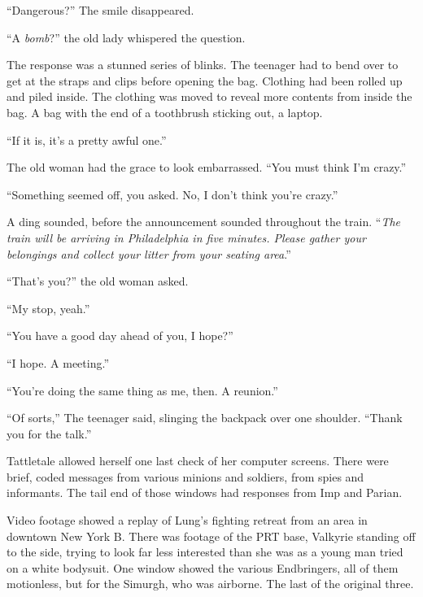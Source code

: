 ``Dangerous?''  The smile disappeared.



``A \emph{bomb}?'' the old lady whispered the question.



The response was a stunned series of blinks.  The teenager had to bend over to get at the straps and clips before opening the bag.  Clothing had been rolled up and piled inside.  The clothing was moved to reveal more contents from inside the bag.  A bag with the end of a toothbrush sticking out, a laptop.



``If it is, it's a pretty awful one.''



The old woman had the grace to look embarrassed.  ``You must think I'm crazy.''



``Something seemed off, you asked.  No, I don't think you're crazy.''



A ding sounded, before the announcement sounded throughout the train.  ``\emph{The train will be arriving in Philadelphia in five minutes.  Please gather your belongings and collect your litter from your seating area}.''



``That's you?'' the old woman asked.



``My stop, yeah.''



``You have a good day ahead of you, I hope?''



``I hope.  A meeting.''



``You're doing the same thing as me, then.  A reunion.''



``Of sorts,'' The teenager said, slinging the backpack over one shoulder.  ``Thank you for the talk.''



\sectionbreak



Tattletale allowed herself one last check of her computer screens.  There were brief, coded messages from various minions and soldiers, from spies and informants.  The tail end of those windows had responses from Imp and Parian.



Video footage showed a replay of Lung's fighting retreat from an area in downtown New York B.  There was footage of the PRT base, Valkyrie standing off to the side, trying to look far less interested than she was as a young man tried on a white bodysuit.  One window showed the various Endbringers, all of them motionless, but for the Simurgh, who was airborne.  The last of the original three.



